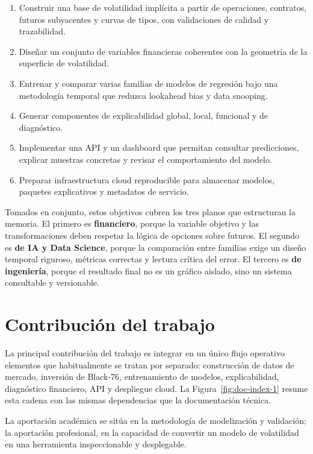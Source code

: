 \begin{enumerate}
  \item Construir una base de volatilidad implícita a partir de operaciones, contratos, futuros subyacentes y curvas de tipos, con validaciones de calidad y trazabilidad.
  \item Diseñar un conjunto de variables financieras coherentes con la geometría de la superficie de volatilidad.
  \item Entrenar y comparar varias familias de modelos de regresión bajo una metodología temporal que reduzca lookahead bias y data snooping.
  \item Generar componentes de explicabilidad global, local, funcional y de diagnóstico.
  \item Implementar una API y un dashboard que permitan consultar predicciones, explicar muestras concretas y revisar el comportamiento del modelo.
  \item Preparar infraestructura cloud reproducible para almacenar modelos, paquetes explicativos y metadatos de servicio.
\end{enumerate}

Tomados en conjunto, estos objetivos cubren los tres planos que estructuran la memoria. El primero es \textbf{financiero}, porque la variable objetivo y las transformaciones deben respetar la lógica de opciones sobre futuros. El segundo es \textbf{de IA y Data Science}, porque la comparación entre familias exige un diseño temporal riguroso, métricas correctas y lectura crítica del error. El tercero es \textbf{de ingeniería}, porque el resultado final no es un gráfico aislado, sino un sistema consultable y versionable.

\section{Contribución del trabajo}
\label{sec:contribucion}

La principal contribución del trabajo es integrar en un único flujo operativo elementos que habitualmente se tratan por separado: construcción de datos de mercado, inversión de Black-76, entrenamiento de modelos, explicabilidad, diagnóstico financiero, API y despliegue cloud. La Figura~\ref{fig:doc-index-1} resume esta cadena con las mismas dependencias que la documentación técnica.

\DiagramIndexOne

La aportación académica se sitúa en la metodología de modelización y validación; la aportación profesional, en la capacidad de convertir un modelo de volatilidad en una herramienta inspeccionable y desplegable.

